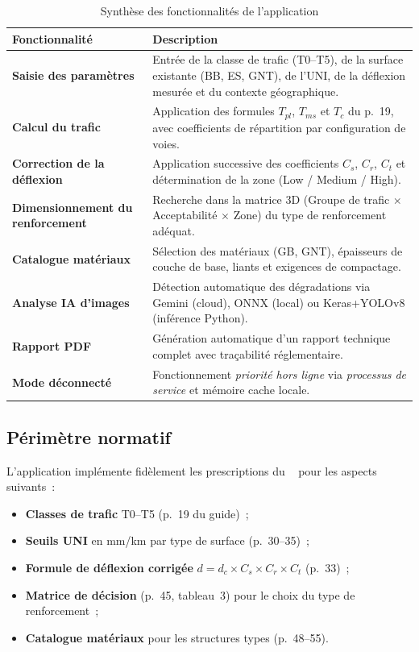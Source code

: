 \begin{table}[H]
\centering
\caption{Synthèse des fonctionnalités de l'application}
\label{tab:cahier}
\renewcommand{\arraystretch}{1.15}
\begin{tabularx}{\textwidth}{@{}>{\bfseries}p{4.2cm} X@{}}
\toprule
Fonctionnalité & Description \\
\midrule
Saisie des paramètres
& Entrée de la classe de trafic (T0--T5), de la surface existante (BB,
ES, GNT), de l'UNI, de la déflexion mesurée et du contexte
géographique. \\
\addlinespace
Calcul du trafic
& Application des formules $T_{pl}$, $T_{ms}$ et $T_c$ du \cttp{}
p.~19, avec coefficients de répartition par configuration de voies. \\
\addlinespace
Correction de la déflexion
& Application successive des coefficients $C_s$, $C_r$, $C_t$ et
détermination de la zone (Low / Medium / High). \\
\addlinespace
Dimensionnement du renforcement
& Recherche dans la matrice 3D (Groupe de trafic
$\times$ Acceptabilité $\times$ Zone) du type de renforcement
adéquat. \\
\addlinespace
Catalogue matériaux
& Sélection des matériaux (GB, GNT), épaisseurs de couche de base,
liants et exigences de compactage. \\
\addlinespace
Analyse IA d'images
& Détection automatique des dégradations via Gemini (cloud), ONNX
(local) ou Keras+YOLOv8 (inférence Python). \\
\addlinespace
Rapport PDF
& Génération automatique d'un rapport technique complet avec
traçabilité réglementaire. \\
\addlinespace
Mode déconnecté
& Fonctionnement \emph{priorité hors ligne} via \emph{processus de service} et mémoire cache
locale. \\
\bottomrule
\end{tabularx}
\end{table}

\subsection{Périmètre normatif}
\label{sec:perimetre}

L'application implémente fidèlement les prescriptions du
\cttp{}~\cite{cttp1992} pour les aspects suivants~:

\begin{itemize}
  \item \textbf{Classes de trafic} T0--T5 (p.~19 du guide)~;
  \item \textbf{Seuils UNI} en mm/km par type de surface (p.~30--35)~;
  \item \textbf{Formule de déflexion corrigée} $d = d_c \times C_s \times
        C_r \times C_t$ (p.~33)~;
  \item \textbf{Matrice de décision} (p.~45, tableau~3) pour le choix du
        type de renforcement~;
  \item \textbf{Catalogue matériaux} pour les structures types
        (p.~48--55).
\end{itemize}

